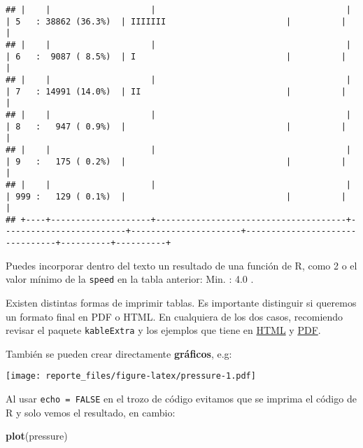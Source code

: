\documentclass[]{article}
\newenvironment{Shaded}{\begin{snugshade}}{\end{snugshade}}
\newcommand{\KeywordTok}[1]{\textcolor[rgb]{0.13,0.29,0.53}{\textbf{#1}}}
\newcommand{\NormalTok}[1]{#1}
\begin{document}
\begin{verbatim}
## |    |                    |                                      |                         | 5   : 38862 (36.3%)  | IIIIIII                        |          |          |
## |    |                    |                                      |                         | 6   :  9087 ( 8.5%)  | I                              |          |          |
## |    |                    |                                      |                         | 7   : 14991 (14.0%)  | II                             |          |          |
## |    |                    |                                      |                         | 8   :   947 ( 0.9%)  |                                |          |          |
## |    |                    |                                      |                         | 9   :   175 ( 0.2%)  |                                |          |          |
## |    |                    |                                      |                         | 999 :   129 ( 0.1%)  |                                |          |          |
## +----+--------------------+--------------------------------------+-------------------------+----------------------+--------------------------------+----------+----------+
\end{verbatim}

Puedes incorporar dentro del texto un resultado de una función de R,
como 2 o el valor mínimo de la \texttt{speed} en la tabla anterior: Min.
: 4.0 .

Existen distintas formas de imprimir tablas. Es importante distinguir si
queremos un formato final en PDF o HTML. En cualquiera de los dos casos,
recomiendo revisar el paquete \texttt{kableExtra} y los ejemplos que
tiene en
\href{https://haozhu233.github.io/kableExtra/awesome_table_in_html.html}{HTML}
y
\href{https://haozhu233.github.io/kableExtra/awesome_table_in_pdf.pdf}{PDF}.

También se pueden crear directamente \textbf{gráficos}, e.g:

\texttt{[image: reporte\_files/figure-latex/pressure-1.pdf]}

Al usar \texttt{echo\ =\ FALSE} en el trozo de código evitamos que se
imprima el código de R y solo vemos el resultado, en cambio:

\begin{Shaded}
\begin{Highlighting}[]
\KeywordTok{plot}\NormalTok{(pressure)}
\end{Highlighting}
\end{Shaded}
\end{document}
